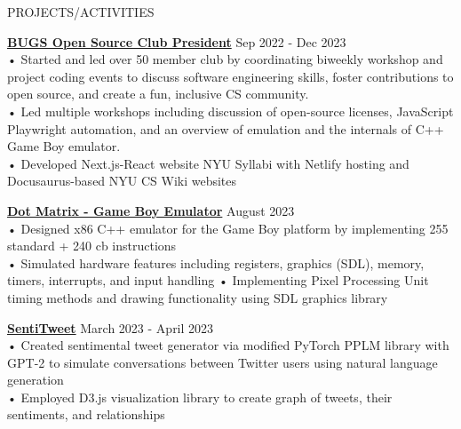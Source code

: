 \documentclass{resume} %
\begin{document}

\begin{rSection}{PROJECTS/ACTIVITIES}

\textbf{\href{https://bugs-nyu.github.io/}{BUGS Open Source Club President}} \hfill Sep 2022 - Dec 2023 \\
• Started and led over 50 member club by coordinating biweekly workshop and project coding events to discuss software engineering skills, foster contributions to open source, and create a fun, inclusive CS community.\\
• Led multiple workshops including discussion of open-source licenses, JavaScript Playwright automation, and an overview of emulation and the internals of C++ Game Boy emulator.\\
• Developed Next.js-React website NYU Syllabi with Netlify hosting and Docusaurus-based NYU CS Wiki websites

\textbf{\href{https://github.com/aminoa/dot-matrix}{Dot Matrix - Game Boy Emulator}} \hfill August 2023 \\
• Designed x86 C++ emulator for the Game Boy platform by implementing 255 standard + 240 cb instructions \\
• Simulated hardware features including registers, graphics (SDL), memory, timers, interrupts, and input handling \newline
• Implementing Pixel Processing Unit timing methods and drawing functionality using SDL graphics library

\textbf {\href{https://github.com/aminoa/sentitweet/}{SentiTweet}} \hfill March 2023 - April 2023 \\
• Created sentimental tweet generator via modified PyTorch PPLM library with GPT-2 to simulate conversations between Twitter users using natural language generation\\
• Employed D3.js visualization library to create graph of tweets, their sentiments, and relationships 


\end{rSection}
\end{document}
